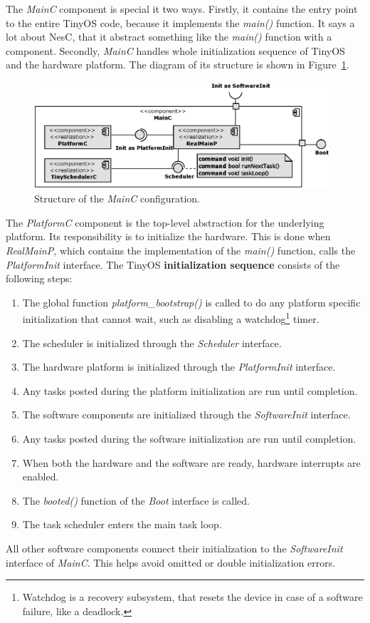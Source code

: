 The \emph{MainC} component is special it two ways. Firstly, it contains the entry point to the entire TinyOS code, because it implements the \emph{main()} function. It says a lot about NesC, that it abstract something like the \emph{main()} function with a component. Secondly, \emph{MainC} handles whole initialization sequence of TinyOS and the hardware platform. The diagram of its structure is shown in Figure~\ref{fig:mainc}.
\begin{figure}[h]
  \centering
  \includegraphics[width=0.98\textwidth]{diagrams/mainc.eps}
  \caption{Structure of the \emph{MainC} configuration.}
  \label{fig:mainc}
\end{figure}

The \emph{PlatformC} component is the top-level abstraction for the underlying platform. Its responsibility is to initialize the hardware. This is done when \emph{RealMainP}, which contains the implementation of the \emph{main()} function, calls the \emph{PlatformInit} interface. The TinyOS {\bf initialization sequence} consists of the following steps:
\begin{enumerate}
  \item The global function \emph{platform\_bootstrap()} is called to do any platform specific initialization that cannot wait, such as disabling a watchdog\footnote{Watchdog is a recovery subsystem, that resets the device in case of a software failure, like a deadlock.} timer.
  \item The scheduler is initialized through the \emph{Scheduler} interface.
  \item The hardware platform is initialized through the \emph{PlatformInit} interface.
  \item Any tasks posted during the platform initialization are run until completion.
  \item The software components are initialized through the \emph{SoftwareInit} interface.
  \item Any tasks posted during the software initialization are run until completion.
  \item When both the hardware and the software are ready, hardware interrupts are enabled.
  \item The \emph{booted()} function of the \emph{Boot} interface is called.
  \item The task scheduler enters the main task loop.
\end{enumerate}
All other software components connect their initialization to the \emph{SoftwareInit} interface of \emph{MainC}. This helps avoid omitted or double initialization errors.

